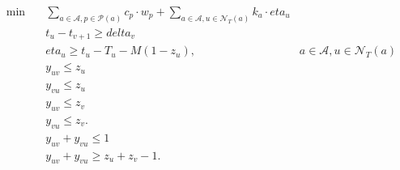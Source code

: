 \begin{align}
  \min\quad & \sum_{a \in \mathcal{A}, p \in \mathcal{P} \left(a\right)} c_{p} \cdot w_{p} + \sum_{a \in \mathcal{A}, u \in \mathcal{N}_{T} \left(a\right)} k_{a} \cdot \mathit{eta}_{u} \tag{eq\_0024} \\
  & t_{u} - t_{v + 1} \geq \mathit{delta}_{v} \tag{eq\_0005\_b} \\
  & \mathit{eta}_{u} \geq t_{u} - T_{u} - M \left(1 - z_{u}\right) , & a \in \mathcal{A} , u \in \mathcal{N}_{T} \left(a\right)  \tag{eq\_0014\_a} \\
  & y_{u v} \leq z_{u} \tag{eq\_0019\_a} \\
  & y_{v u} \leq z_{u} \tag{eq\_0019\_b} \\
  & y_{u v} \leq z_{v} \tag{eq\_0019\_c} \\
  & y_{v u} \leq z_{v} . \tag{eq\_0019\_d} \\
  & y_{u v} + y_{v u} \leq 1 \tag{eq\_0020} \\
  & y_{u v} + y_{v u} \geq z_{u} + z_{v} - 1 . \tag{eq\_0021} \\
\end{align}
